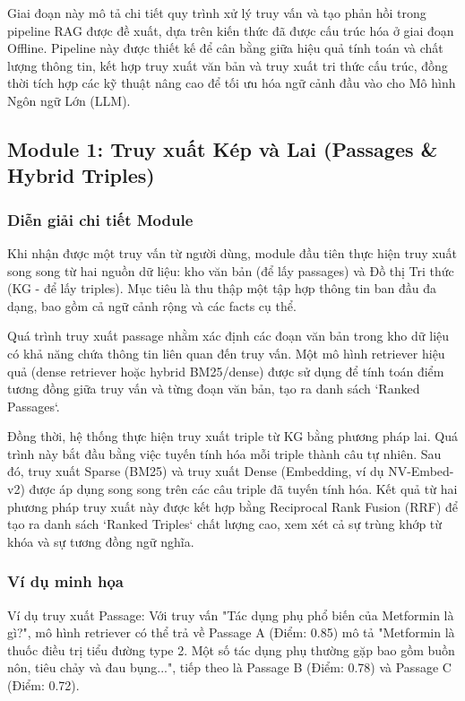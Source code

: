 \documentclass{article}
\begin{document}
Giai đoạn này mô tả chi tiết quy trình xử lý truy vấn và tạo phản hồi trong pipeline RAG được đề xuất, dựa trên kiến thức đã được cấu trúc hóa ở giai đoạn Offline. Pipeline này được thiết kế để cân bằng giữa hiệu quả tính toán và chất lượng thông tin, kết hợp truy xuất văn bản và truy xuất tri thức cấu trúc, đồng thời tích hợp các kỹ thuật nâng cao để tối ưu hóa ngữ cảnh đầu vào cho Mô hình Ngôn ngữ Lớn (LLM).

\subsection{Module 1: Truy xuất Kép và Lai (Passages \& Hybrid Triples)}

\subsubsection{Diễn giải chi tiết Module}
Khi nhận được một truy vấn từ người dùng, module đầu tiên thực hiện truy xuất song song từ hai nguồn dữ liệu: kho văn bản (để lấy passages) và Đồ thị Tri thức (KG - để lấy triples). Mục tiêu là thu thập một tập hợp thông tin ban đầu đa dạng, bao gồm cả ngữ cảnh rộng và các facts cụ thể.

Quá trình truy xuất passage nhằm xác định các đoạn văn bản trong kho dữ liệu có khả năng chứa thông tin liên quan đến truy vấn. Một mô hình retriever hiệu quả (dense retriever hoặc hybrid BM25/dense) được sử dụng để tính toán điểm tương đồng giữa truy vấn và từng đoạn văn bản, tạo ra danh sách `Ranked Passages`.

Đồng thời, hệ thống thực hiện truy xuất triple từ KG bằng phương pháp lai. Quá trình này bắt đầu bằng việc tuyến tính hóa mỗi triple thành câu tự nhiên. Sau đó, truy xuất Sparse (BM25) và truy xuất Dense (Embedding, ví dụ NV-Embed-v2) được áp dụng song song trên các câu triple đã tuyến tính hóa. Kết quả từ hai phương pháp truy xuất này được kết hợp bằng Reciprocal Rank Fusion (RRF) để tạo ra danh sách `Ranked Triples` chất lượng cao, xem xét cả sự trùng khớp từ khóa và sự tương đồng ngữ nghĩa.

\subsubsection{Ví dụ minh họa}
Ví dụ truy xuất Passage: Với truy vấn "Tác dụng phụ phổ biến của Metformin là gì?", mô hình retriever có thể trả về Passage A (Điểm: 0.85) mô tả "Metformin là thuốc điều trị tiểu đường type 2. Một số tác dụng phụ thường gặp bao gồm buồn nôn, tiêu chảy và đau bụng...", tiếp theo là Passage B (Điểm: 0.78) và Passage C (Điểm: 0.72).
\end{document}
